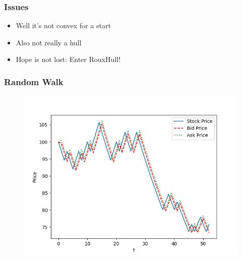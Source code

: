 \documentclass{beamer}
\begin{document}
\begin{frame}
\frametitle{Issues}
\begin{itemize}
	\item Well it's not convex for a start
	\pause
	\item Also not really a hull
	\pause
    \item Hope is not lost: Enter RouxHull!
\end{itemize}
\end{frame}

\begin{frame}
    \frametitle{Random Walk}
        \begin{figure}
            \center
            \includegraphics[scale=0.6]{../Figures/upperapproxstockprice.png}
        \end{figure}
\end{frame}
\end{document}
